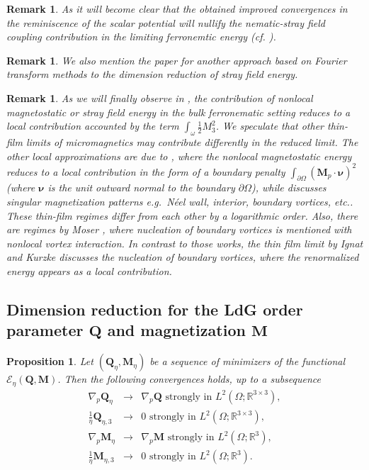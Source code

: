 \documentclass{article}
\newtheorem{proposition}[theorem]{Proposition}
\newtheorem{remark}[theorem]{Remark}
\def\Qvec{\mathbf{Q}}
\def \Mvec{\mathbf{M}}
\begin{document}
\begin{remark}
As it will become clear that the obtained improved convergences in the reminiscence of the scalar potential will nullify the nematic-stray field coupling contribution in the limiting ferronemtic energy (cf. ).
\end{remark}
\begin{remark}
We also mention the paper \cite{garcia2004one} for another approach based on Fourier transform methods to the dimension reduction of stray field energy.
\end{remark}
\begin{remark}
As we will finally observe in , the contribution of nonlocal magnetostatic or stray field energy in the bulk ferronematic setting reduces to a local contribution accounted by the term $\int_{\omega}\frac{1}{2}M_3^2$. We speculate that other thin-film limits of micromagnetics may contribute differently in the reduced limit. The other local approximations are due to \cite{carbou2001thin, kohn2005another}, where the nonlocal magnetostatic energy reduces to a local contribution in the form of a boundary penalty $\int_{\partial\Omega}\left(\Mvec_p\cdot\bm{\nu}\right)^2$ (where $\bm{\nu}$ is the unit outward normal to the boundary $\partial\Omega$), while \cite{desimone2004recent} discusses singular magnetization patterns e.g.\ Néel wall, interior, boundary vortices, etc.. These thin-film regimes differ from each other by a logarithmic order. \newline
Also, there are regimes by Moser \cite{moser2004boundary, moser2003ginzburg, moser2005moving}, where nucleation of boundary vortices is mentioned with nonlocal vortex interaction. In contrast to those works, the thin film limit by Ignat and Kurzke \cite{ignat2023effective, ignat2021global} discusses the nucleation of boundary vortices, where the renormalized energy appears as a local contribution.
\subsection{Dimension reduction for the LdG order parameter $\Qvec$ and magnetization $\Mvec$}
\end{remark}
\begin{proposition}\label{reduced-QM}
Let $\left(\Qvec_{\eta}, \Mvec_{\eta}\right)$ be a sequence of minimizers of the functional $\mathcal{E}_{\eta}\left(\Qvec, \Mvec\right)$. Then the following convergences holds, up to a subsequence
\begin{eqnarray}
\nabla_p\Qvec_{\eta}&\rightarrow&\nabla_p\Qvec \mbox{ strongly in } L^2\left(\Omega; \mathbb R^{3\times 3}\right),\label{eq:strong_gQ}\\
\frac{1}{\eta}\Qvec_{\eta,3}&\rightarrow& 0 \mbox{ strongly in } L^2\left(\Omega; \mathbb R^{3\times 3}\right),\label{eq:strong1_gQ}\\
\nabla_p\Mvec_{\eta}&\rightarrow&\nabla_p\Mvec \mbox{ strongly in } L^2\left(\Omega; \mathbb R^{3}\right),\label{eq:strong_gM}\\
\frac{1}{\eta}\Mvec_{\eta,3}&\rightarrow& 0 \mbox{ strongly in } L^2\left(\Omega; \mathbb R^{3}\right)\label{eq:strong1_gM}.
\end{eqnarray}
\end{proposition}
\end{document}
